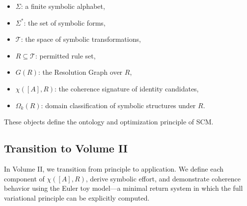\begin{itemize}
    \item $\Sigma$: a finite symbolic alphabet,
    \item $\Sigma^*$: the set of symbolic forms,
    \item $\mathcal{T}$: the space of symbolic transformations,
    \item $R \subseteq \mathcal{T}$: permitted rule set,
    \item $G(R)$: the Resolution Graph over $R$,
    \item $\chi([A], R)$: the coherence signature of identity candidates,
    \item $\Omega_k(R)$: domain classification of symbolic structures under $R$.
\end{itemize}

These objects define the ontology and optimization principle of SCM.

\subsection*{Transition to Volume II}

In Volume II, we transition from principle to application. We define each component of $\chi([A], R)$, derive symbolic effort, and demonstrate coherence behavior using the Euler toy model—a minimal return system in which the full variational principle can be explicitly computed.

